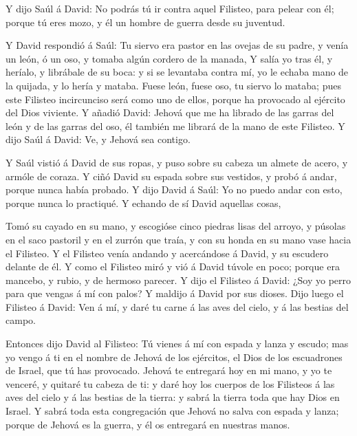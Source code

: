  Y dijo Saúl á David: No podrás tú ir contra aquel
Filisteo, para pelear con él; porque tú eres mozo, y él un hombre de
guerra desde su juventud.

 Y David respondió á Saúl: Tu siervo era pastor en las
ovejas de su padre, y venía un león, ó un oso, y tomaba algún cordero de
la manada,  Y salía yo tras él, y heríalo, y librábale de
su boca: y si se levantaba contra mí, yo le echaba mano de la quijada, y
lo hería y mataba.  Fuese león, fuese oso, tu siervo lo
mataba; pues este Filisteo incircunciso será como uno de ellos, porque
ha provocado al ejército del Dios viviente.  Y añadió
David: Jehová que me ha librado de las garras del león y de las garras
del oso, él también me librará de la mano de este Filisteo. Y dijo Saúl
á David: Ve, y Jehová sea contigo.

 Y Saúl vistió á David de sus ropas, y puso sobre su cabeza
un almete de acero, y armóle de coraza.  Y ciñó David su
espada sobre sus vestidos, y probó á andar, porque nunca había probado.
Y dijo David á Saúl: Yo no puedo andar con esto, porque nunca lo
practiqué. Y echando de sí David aquellas cosas,

 Tomó su cayado en su mano, y escogióse cinco piedras lisas
del arroyo, y púsolas en el saco pastoril y en el zurrón que traía, y
con su honda en su mano vase hacia el Filisteo.  Y el
Filisteo venía andando y acercándose á David, y su escudero delante de
él.  Y como el Filisteo miró y vió á David túvole en poco;
porque era mancebo, y rubio, y de hermoso parecer.  Y dijo
el Filisteo á David: ¿Soy yo perro para que vengas á mí con palos? Y
maldijo á David por sus dioses.  Dijo luego el Filisteo á
David: Ven á mí, y daré tu carne á las aves del cielo, y á las bestias
del campo.

 Entonces dijo David al Filisteo: Tú vienes á mí con espada
y lanza y escudo; mas yo vengo á ti en el nombre de Jehová de los
ejércitos, el Dios de los escuadrones de Israel, que tú has provocado.
 Jehová te entregará hoy en mi mano, y yo te venceré, y
quitaré tu cabeza de ti: y daré hoy los cuerpos de los Filisteos á las
aves del cielo y á las bestias de la tierra: y sabrá la tierra toda que
hay Dios en Israel.  Y sabrá toda esta congregación que
Jehová no salva con espada y lanza; porque de Jehová es la guerra, y él
os entregará en nuestras manos.

